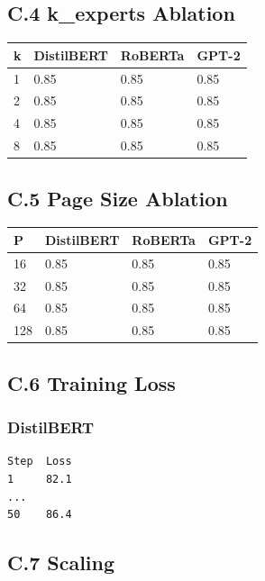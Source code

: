 \subsection{C.4 k\_experts Ablation}

\begin{table}[H]
\centering
\small
\begin{tabular}{llll}
\toprule
\textbf{k} & \textbf{DistilBERT} & \textbf{RoBERTa} & \textbf{GPT-2} \\
\midrule
1 & 0.85 & 0.85 & 0.85 \\
2 & 0.85 & 0.85 & 0.85 \\
4 & 0.85 & 0.85 & 0.85 \\
8 & 0.85 & 0.85 & 0.85 \\
\bottomrule
\end{tabular}
\end{table}

\subsection{C.5 Page Size Ablation}

\begin{table}[H]
\centering
\small
\begin{tabular}{llll}
\toprule
\textbf{P} & \textbf{DistilBERT} & \textbf{RoBERTa} & \textbf{GPT-2} \\
\midrule
16 & 0.85 & 0.85 & 0.85 \\
32 & 0.85 & 0.85 & 0.85 \\
64 & 0.85 & 0.85 & 0.85 \\
128 & 0.85 & 0.85 & 0.85 \\
\bottomrule
\end{tabular}
\end{table}

\subsection{C.6 Training Loss}

\subsubsection{DistilBERT}
\begin{lstlisting}
Step  Loss
1     82.1
...
50    86.4
\end{lstlisting}

\subsection{C.7 Scaling}

